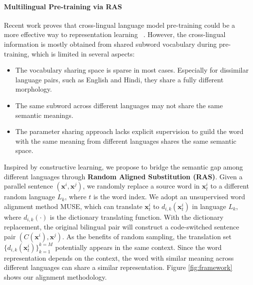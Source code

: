 \documentclass[11pt,a4paper]{article}
\newcommand{\xx}{\mathbf{x}}
\begin{document}
\paragraph{Multilingual Pre-training via RAS}

Recent work proves that cross-lingual language model pre-training could be a more effective way to representation learning ~\cite{DBLP:conf/nips/ConneauL19,huang2019unicoder}.
However, the cross-lingual information is mostly obtained from shared subword vocabulary during pre-training, which is limited in several aspects:
\begin{itemize}
    \setlength{\itemsep}{0pt}
    \setlength{\parsep}{0pt}
    \setlength{\parskip}{0pt}
    \item The vocabulary sharing space is sparse in most cases. Especially for dissimilar language pairs, such as English and Hindi, they share a fully different morphology. 
    \item The same subword across different languages may not share the same semantic meanings. 
    \item The parameter sharing approach lacks explicit supervision to guild the word with the same meaning from different languages shares the same semantic space.
\end{itemize}

Inspired by constructive learning, we propose to bridge the semantic gap among different languages through \textbf{Random Aligned Substitution (RAS)}. 
Given a parallel sentence $(\xx^i, \xx^j)$,  we randomly replace a source word in $\xx^i_t$ to a different random language $L_k$, where $t$ is the word index. We adopt an unsupervised word alignment method MUSE\cite{conneau2017word}, which can  translate $\xx^i_t$ to $d_{i,k}(\xx^i_t)$ in language $L_k$, where $d_{i,k}(\cdot)$ is the dictionary translating function. 
With the dictionary replacement, the original bilingual pair will construct a code-switched sentence pair $(C(\xx^i), \xx^j)$.  
As the benefits of  random sampling, the translation set  $\{d_{i,k}(\xx^i_t)\}_{k=1}^{k=M}$ potentially appears in the same context. 
Since the word representation depends on the context, the word with similar meaning across different languages can share a similar representation. Figure \ref{fig:framework} shows our alignment methodology. 
\end{document}
